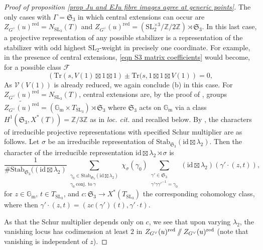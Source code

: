 \documentclass[10pt]{article}
\newcommand{\stab}[2]{\mathrm{Stab}_{#1}(#2)}
\newcommand{\id}{\mathrm{id}}
\newcommand{\git}{\mathbin{
  \mathchoice{/\mkern-6mu/}%
    {/\mkern-6mu/}%
    {/\mkern-5mu/}%
    {/\mkern-5mu/}}}%
\newcommand{\Z}{\mathbb{Z}}
\newcommand{\SL}{\mathrm{SL}}
\newcommand{\Gm}{{\mathbb{G}_\mathrm{m}}}
\newcommand{\Sn}{\mathfrak{S}}
\theoremstyle{definition}
\theoremstyle{remark}
\newcommand{\Zur}{Z_{G^\vee}(u)^{\mathrm{red}}}
\begin{document}
\begin{proof}[Proof of proposition \ref{prop Ju and EJu fibre images agree at generic points}]
The only cases with $\Gamma=\Sn_3$ in which central extensions can occur are $\Zur=N_{\SL_3}(T)$ and $\Zur=\left(\SL_2^{\times 3}/\Z/2\Z\right)\rtimes\Sn_3$. In this last case, a projective representation of any possible stabilizer is a representation of the stabilizer with odd highest $\SL_2$-weight in precisely one coordinate. For example, in the presence of central extensions, \eqref{eqn S3 matrix coefficients} would become, for a possible class $\mathcal{F}$
%
\[
\left(\mathrm{Tr}(s, V(1)\boxtimes 1\boxtimes 1)\pm\mathrm{Tr}(s, 1\boxtimes 1\boxtimes V(1)\right)=0,
\]
%
As $\mathcal{V}(V(1))$ is already reduced, we again conclude (b) in this case. For $\Zur=N_{\SL_3}(T)$,
central extensions are, by the proof of \cite[Lem. 2.1.22]{Propp}, groups
$\widetilde{\Zur}=(\Gm\times T_{\SL_3})\rtimes\Sn_3$ where $\Sn_3$ acts on $\Gm$ via a class $H^1(\Sn_3, X^*(T))=\Z/3\Z$ as in \textit{loc. cit.} and recalled below. By \cite[Prop. 4.1]{MatsTaka}, the characters of irreducible
projective representations with specified Schur multiplier are as follows. Let $\sigma$ be an irreducible representation of $\stab{\Sn_3}{\id\boxtimes\lambda_2}$. Then the character of the irreducible representation $\id\boxtimes\lambda_2\rtimes\sigma$ is 
%
\[
\frac{1}{\# \stab{\Sn_3}{(\id\boxtimes\lambda_2}}\sum_{\substack{\gamma_0\in \stab{\Sn_3}{\id\boxtimes\lambda_2}\\ \gamma_0~\text{conj. to}~\gamma}}\chi_\sigma(\gamma_0)\sum_{\substack{\gamma'\in\Sn_3 \\ \gamma'\gamma\gamma'^{-1}=\gamma_0}}(\id\boxtimes\lambda_2)(\gamma'\cdot(z,t)),
\]
%
for $z\in\Gm$, $t\in T_{\SL_3}$, and  $c\colon\Sn_3\to X^*(T_{\SL_3})$ the corresponding cohomology class, where then $\gamma'\cdot(z,t)=(zc(\gamma')(t), \gamma'\cdot t)$. 

As that the Schur multiplier depends only on $c$, we see that upon varying $\lambda_2$, the vanishing locus has codimension at least $2$ in $\Zur\git\Zur$ (note that vanishing is independent of $z$).


\end{proof}
\end{document}
